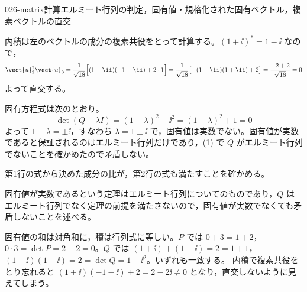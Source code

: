 \documentclass[uplatex,dvipdfmx,a4paper,11pt]{jsarticle}
\begin{document}
\begin{mondai}{026-matrix}{計算}{エルミート行列の判定，固有値・規格化された固有ベクトル，複素ベクトルの直交}
\begin{tadashii}
 内積は左のベクトルの成分の複素共役をとって計算する。$(1+\ii)^{*}=1-\ii$ なので，
\[ \vect{u}_{3}^{\dagger}\vect{u}_{0}=\frac{1}{\sqrt{18}}\Bigl[(1-\ii)(-1-\ii)+2\cdot 1\Bigr]=\frac{1}{\sqrt{18}}\bigl[-(1-\ii)(1+\ii)+2\bigr]=\frac{-2+2}{\sqrt{18}}=0 \]
よって直交する。

 固有方程式は次のとおり。
\[ \det(Q-\lambda I)=(1-\lambda)^{2}-\ii^{2}=(1-\lambda)^{2}+1=0 \]
よって $1-\lambda=\pm\ii$，すなわち $\lambda=1\pm\ii$ で，固有値は実数でない。固有値が実数であると保証されるのはエルミート行列だけであり，(1) で $Q$ がエルミート行列でないことを確かめたので矛盾しない。
\begin{ronten}
  \item {} 第1行の式から決めた成分の比が，第2行の式も満たすことを確かめる。
  \item {} 固有値が実数であるという定理はエルミート行列についてのものであり，$Q$ はエルミート行列でなく定理の前提を満たさないので，固有値が実数でなくても矛盾しないことを述べる。
\end{ronten}
\kenzan 固有値の和は対角和に，積は行列式に等しい。$P$ では $0+3=1+2$，$0\cdot 3=\det P=2-2=0$。$Q$ では $(1+\ii)+(1-\ii)=2=1+1$，$(1+\ii)(1-\ii)=2=\det Q=1-\ii^{2}$。いずれも一致する。
\tsumazuki 内積で複素共役をとり忘れると $(1+\ii)(-1-\ii)+2=2-2\ii\neq 0$ となり，直交しないように見えてしまう。
\end{tadashii}
\end{mondai}
\end{document}
